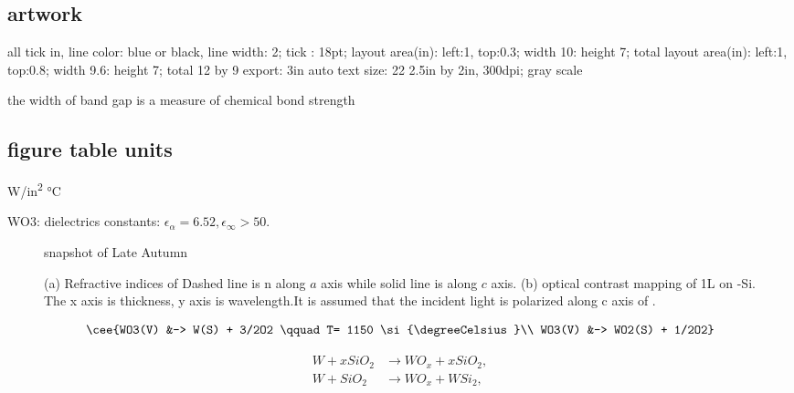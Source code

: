 

\subsection{artwork}

 all tick in, line color: blue or black, line width: 2; tick : 18pt;
 layout area(in): left:1, top:0.3; width 10: height 7; total
 layout area(in): left:1, top:0.8; width 9.6: height 7; total 12 by 9
 export: 3in auto
 text size: 22
2.5in by 2in, 300dpi; gray scale

the width of band gap is a measure of chemical bond strength

\subsection{figure table units}
\si{W/in^2}
\si{\degreeCelsius}

 WO3: dielectrics constants: $\epsilon_\alpha = 6.52,\epsilon_\infty > 50$. \cite{Deb2008}
\begin{figure}[htb]
\centering
{}\hspace{0.04\textwidth}

\caption{snapshot of Late Autumn}
\label{fig:tw}
\end{figure}

\begin{figure}[htb]
\centering
{}%
\caption[Refractive indices of ]{(a) Refractive indices of  Dashed line is n along $a$ axis while solid line is along $c$ axis. (b) optical contrast mapping of 1L  on -Si. The x axis is  thickness, y axis is wavelength.It is assumed that the incident light is polarized along c axis of .}
\label{fig:mofl}
\end{figure}


\begin{align}
\cee{WO3(V) &-> W(S) + 3/2O2 \qquad T= 1150 \si{\degreeCelsius}\\
        WO3(V) &-> WO2(S) + 1/2O2}
\end{align}

\begin{align}
W + xSiO{_2} &\rightarrow WO{_x} + xSiO{_2},\\
W + SiO{_2}   &\rightarrow WO{_x} + WSi{_2},
\end{align}

